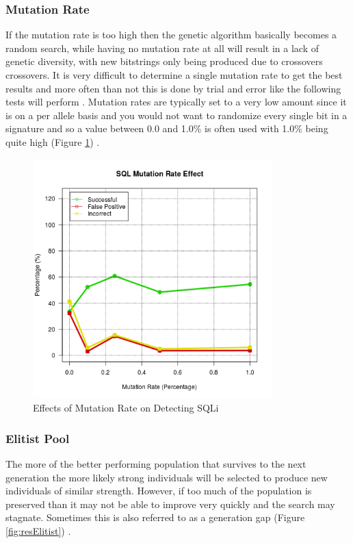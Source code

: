 \newpage
\subsubsection{Mutation Rate} \label{sec:resMutation}

If the mutation rate is too high then the genetic algorithm basically becomes a random search, while having no mutation rate at all will result in a lack of genetic diversity, with new bitstrings only being produced due to crossovers crossovers.  It is very difficult to determine a single mutation rate to get the best results and more often than not this is done by trial and error like the following tests will perform \cite{aNewStrategy}.  Mutation rates are typically set to a very low amount since it is on a per allele basis and you would not want to randomize every single bit in a signature and so a value between 0.0 and 1.0\% is often used with 1.0\% being quite high (Figure \ref{fig:resMutation}) \cite{optimizationOfControlParameters}.

\begin{figure}[hb]
	\centering
	\includegraphics[width=350px]{./assets/results/ga/mutation/Results_SQL.png}
	\caption{Effects of Mutation Rate on Detecting SQLi}
	\label{fig:resMutation}
\end{figure}

\newpage
\subsubsection{Elitist Pool} \label{sec:resElitist}

The more of the better performing population that survives to the next generation the more likely strong individuals will be selected to produce new individuals of similar strength.  However, if too much of the population is preserved than it may not be able to improve very quickly and the search may stagnate.  Sometimes this is also referred to as a generation gap (Figure \ref{fig:resElitist}) \cite{optimizationOfControlParameters}.

